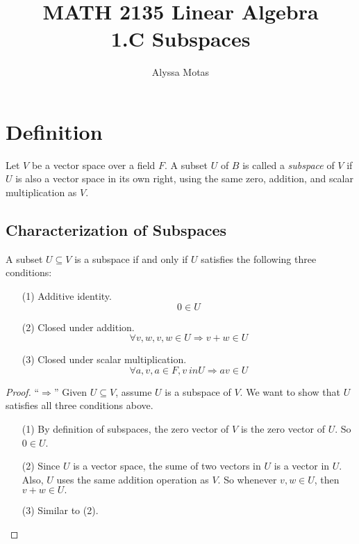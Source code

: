 \documentclass[11pt]{article}
\title{\textbf{MATH 2135 Linear Algebra} \\ 1.C Subspaces}
\author{Alyssa Motas}
\begin{document}
    \maketitle

    \pagebreak

    \tableofcontents

    \pagebreak

    \section{Definition}

    Let $V$ be a vector space over a field $F$. A subset $U$ of $B$ is called a \emph{subspace} of $V$ if $U$ is also a vector space in its own right, using the same zero, addition, and scalar multiplication as $V$.

    \subsection{Characterization of Subspaces}

    A subset $U \subseteq V$ is a subspace if and only if $U$ satisfies the following three conditions:

    \begin{enumerate}
        \item[(1)] Additive identity. \[0 \in U\]
        \item[(2)] Closed under addition. \[\forall v,w, v,w \in U \Rightarrow v + w \in U\] 
        \item[(3)] Closed under scalar multiplication. \[\forall a,v, a \in F, v \ in U \Rightarrow av \in U\] 
    \end{enumerate}
    \begin{proof}
        ``\(\Rightarrow\)'' Given \(U \subseteq V\), assume $U$ is a subspace of $V$. We want to show that $U$ satisfies all three conditions above.
        \begin{enumerate}
            \item[(1)] By definition of subspaces, the zero vector of $V$ is the zero vector of $U$. So \(0 \in U\).
            \item[(2)] Since $U$ is a vector space, the sume of two vectors in $U$ is a vector in $U$. Also, $U$ uses the same addition operation as $V$. So whenever \(v,w \in U\), then \(v + w \in U.\)
            \item[(3)] Similar to (2).  
        \end{enumerate}
    \end{proof}
\end{document}
